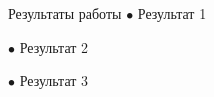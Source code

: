 \begin{frame}{Результаты работы}
$\bullet$ Результат 1

$\bullet$ Результат 2

$\bullet$ Результат 3

\end{frame}